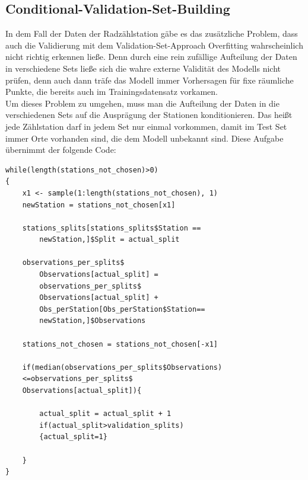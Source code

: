 \documentclass[a4paper,12pt]{thesis}
\begin{document}
\subsection{Conditional-Validation-Set-Building}

In dem Fall der Daten der Radzählstation gäbe es das zusätzliche Problem, dass auch die Validierung mit dem Validation-Set-Approach Overfitting wahrscheinlich nicht richtig erkennen ließe. Denn durch eine rein zufällige Aufteilung der Daten in verschiedene Sets ließe sich die wahre externe Validität des Modells nicht prüfen, denn auch dann träfe das Modell immer Vorhersagen für fixe räumliche Punkte, die bereits auch im Trainingsdatensatz vorkamen.\\
Um dieses Problem zu umgehen, muss man die Aufteilung der Daten in die verschiedenen Sets auf die Ausprägung der Stationen konditionieren. Das heißt jede Zählstation darf in jedem Set nur einmal vorkommen, damit im Test Set immer Orte vorhanden sind, die dem Modell unbekannt sind. Diese Aufgabe übernimmt der folgende Code:

\begin{minipage}{\linewidth}
\begin{lstlisting}[caption={Aufteilung der Zählstationen},label=code:valSetBui]
while(length(stations_not_chosen)>0)
{
	x1 <- sample(1:length(stations_not_chosen), 1)
	newStation = stations_not_chosen[x1]
	
	stations_splits[stations_splits$Station == 
		newStation,]$Split = actual_split
	
	observations_per_splits$
		Observations[actual_split] = 				
		observations_per_splits$
		Observations[actual_split] + 
		Obs_perStation[Obs_perStation$Station== 
		newStation,]$Observations
	
	stations_not_chosen = stations_not_chosen[-x1]
	
	if(median(observations_per_splits$Observations)
	<=observations_per_splits$
	Observations[actual_split]){
		
		actual_split = actual_split + 1
		if(actual_split>validation_splits)
		{actual_split=1}
		
	}
}
\end{lstlisting}
\end{minipage}
\end{document}
